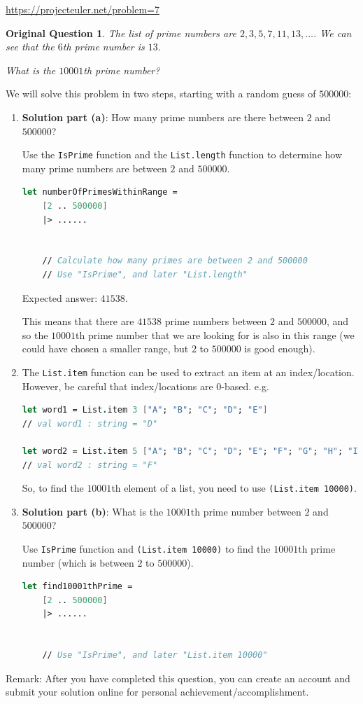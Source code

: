 \documentclass[12pt]{article}
\newtheorem*{origQuestion*}{Original Question}
\begin{document}
\url{https://projecteuler.net/problem=7}

\begin{origQuestion*}
The list of prime numbers are $2, 3, 5, 7, 11, 13, \ldots$. We can see that the $6$th prime number is $13$. 

What is the $10001$th prime number?
\end{origQuestion*}

We will solve this problem in two steps, starting with a random guess of $500000$:
\begin{enumerate}
\item \textbf{Solution part (a)}: How many prime numbers are there between $2$ and $500000$?

Use the \texttt{IsPrime} function and the \texttt{List.length} function to determine how many prime numbers are between $2$ and $500000$.
\begin{lstlisting}[language=FSharp]
let numberOfPrimesWithinRange =
    [2 .. 500000]
    |> ......


    // Calculate how many primes are between 2 and 500000
    // Use "IsPrime", and later "List.length"
\end{lstlisting}
Expected answer: $41538$. 

This means that there are $41538$ prime numbers between $2$ and $500000$, and so the $10001$th prime number that we are looking for is also in this range (we could have chosen a smaller range, but $2$ to $500000$ is good enough).

\pagebreak

\item The \texttt{List.item} function can be used to extract an item at an index/location. However, be careful that index/locations are $0$-based. e.g.
\begin{lstlisting}[language=FSharp]
let word1 = List.item 3 ["A"; "B"; "C"; "D"; "E"]
// val word1 : string = "D"

let word2 = List.item 5 ["A"; "B"; "C"; "D"; "E"; "F"; "G"; "H"; "I"; "J"]
// val word2 : string = "F"
\end{lstlisting}
So, to find the $10001$th element of a list, you need to use \texttt{(List.item 10000)}.

\item \textbf{Solution part (b)}: What is the $10001$th prime number between $2$ and $500000$?

Use \texttt{IsPrime} function and \texttt{(List.item 10000)} to find the $10001$th prime number (which is between $2$ to $500000$).
\begin{lstlisting}[language=FSharp]
let find10001thPrime =
    [2 .. 500000]
    |> ......


    // Use "IsPrime", and later "List.item 10000"
\end{lstlisting}

\end{enumerate}
Remark: After you have completed this question, you can create an account and submit your solution online for personal achievement/accomplishment.
\end{document}
